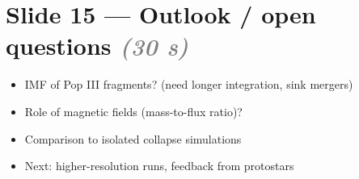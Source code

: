 \documentclass[12pt]{article}
\newcommand{\timing}[1]{\textcolor{gray}{\textit{(#1)}}}
\begin{document}
\section*{Slide 15 --- Outlook / open questions \timing{30 s}}

\begin{itemize}
  \item IMF of Pop III fragments? (need longer integration, sink mergers)
  \item Role of magnetic fields (mass-to-flux ratio)?
  \item Comparison to isolated collapse simulations
  \item Next: higher-resolution runs, feedback from protostars
\end{itemize}
\end{document}
